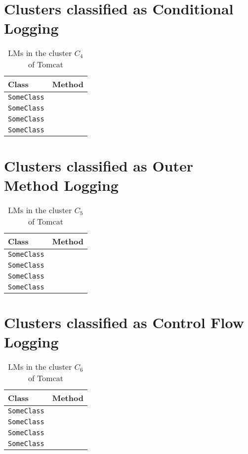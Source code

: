 \section{Clusters classified as Conditional Logging}

\begin{table}[!tbh]
\caption{LMs in the cluster $C_4$ of Tomcat}
\centering\begin{tabular}{ll}\toprule
Class&Method\\\midrule
\lstinline/SomeClass/&\raisebox{-2pt}{\lstinline/foo(int)/}\\
\lstinline/SomeClass/&\raisebox{-2pt}{\lstinline/foo(int)/}\\
\lstinline/SomeClass/&\raisebox{-2pt}{\lstinline/foo(int)/}\\
\lstinline/SomeClass/&\raisebox{-2pt}{\lstinline/foo(int)/}\\
\bottomrule
\end{tabular}
\end{table}

\section{Clusters classified as Outer Method Logging}

\begin{table}[!tbh]
\caption{LMs in the cluster $C_5$ of Tomcat}
\centering\begin{tabular}{ll}\toprule
Class&Method\\\midrule
\lstinline/SomeClass/&\raisebox{-2pt}{\lstinline/foo(int)/}\\
\lstinline/SomeClass/&\raisebox{-2pt}{\lstinline/foo(int)/}\\
\lstinline/SomeClass/&\raisebox{-2pt}{\lstinline/foo(int)/}\\
\lstinline/SomeClass/&\raisebox{-2pt}{\lstinline/foo(int)/}\\
\bottomrule
\end{tabular}
\end{table}

\section{Clusters classified as Control Flow Logging}

\begin{table}[!tbh]
\caption{LMs in the cluster $C_6$ of Tomcat}
\centering\begin{tabular}{ll}\toprule
Class&Method\\\midrule
\lstinline/SomeClass/&\raisebox{-2pt}{\lstinline/foo(int)/}\\
\lstinline/SomeClass/&\raisebox{-2pt}{\lstinline/foo(int)/}\\
\lstinline/SomeClass/&\raisebox{-2pt}{\lstinline/foo(int)/}\\
\lstinline/SomeClass/&\raisebox{-2pt}{\lstinline/foo(int)/}\\
\bottomrule
\end{tabular}
\end{table}

